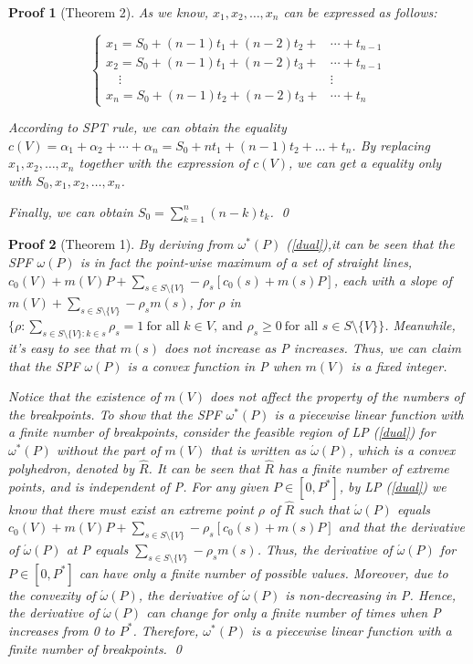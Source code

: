 \documentclass[UTF8]{article}
\newtheorem{pf}{\hspace{2em}Proof}
\begin{document}
\begin{pf}[Theorem 2]
As we know, $x_1,x_2,\dots,x_n$ can be expressed as follows:

\[
\begin{cases}
x_1 = S_0 + (n-1)t_1 + (n-2)t_2 + &\cdots + t_{n-1} \\
x_2 = S_0 + (n-1)t_1 + (n-2)t_3 + &\cdots + t_{n-1} \\
\quad   \vdots        &\vdots\\
x_n = S_0 + (n-1)t_2 + (n-2)t_3 + &\cdots + t_{n}
\end{cases}
\]

According to SPT rule, we can obtain the equality
$c(V)=\alpha_1+\alpha_2+\cdots+\alpha_n=S_0+nt_1+(n-1)t_2+\dots+t_n$.
By replacing $x_1,x_2,\dots,x_n$ together with the expression of $c(V)$, we can get a equality only with $S_0,x_1,x_2,\dots,x_n$.

Finally, we can obtain $S_0 = \sum_{k=1}^n (n-k)t_k$.
\qed
\end{pf}


\begin{pf}[Theorem 1]

By deriving from $\omega^* (P)$ (\ref{dual}),it can be seen that the SPF $\omega(P)$ is in fact the point-wise maximum of a set of straight lines, $c_0(V)+m(V)P+\sum_{s\in S\setminus\{V\}}-\rho_s[c_0(s)+m(s)P]$, each with a slope of $m(V)+\sum_{s\in S\setminus\{V\}} −\rho_s m(s)$, for $\rho$ in $\{\rho :\sum_{s\in S\setminus \{V\}:k\in s} \rho_s=1\  \text{for all }  k\in V,\ \text{and } \rho_s \geq 0\ \text{for all } s\in S\setminus \{V\} \}$.
Meanwhile, it's easy to see that $m(s)$ does not increase as P increases. Thus, we can claim that the SPF $\omega(P)$ is a convex function in P when $m(V)$ is a fixed integer.

Notice that the existence of $m(V)$ does not affect the property of the numbers of the breakpoints.
To show that the SPF $\omega^* (P)$ is a piecewise linear function with a ﬁnite number of breakpoints, consider the feasible region of LP (\ref{dual}) for $\omega^* (P)$ without the part of $m(V)$ that is written as $\acute{\omega} (P)$, which is a convex polyhedron, denoted by $\hat{R}$. It can be seen that $\hat{R}$ has a ﬁnite number of extreme points, and is independent of P. For any given $P \in [0,P^*]$, by LP (\ref{dual}) we know that there must exist an extreme point $\rho$ of $\hat{R}$ such that $\acute{\omega} (P)$ equals
$c_0(V)+m(V)P+\sum_{s\in S\setminus\{V\}}-\rho_s[c_0(s)+m(s)P]$
and that the derivative of $\acute{\omega} (P)$ at P equals $\sum_{s\in S\setminus\{V\}} −\rho_s m(s)$. Thus, the derivative of $\acute{\omega} (P)$ for $P \in [0,P^*]$ can have only a ﬁnite number of possible values. Moreover, due to the convexity of $\acute{\omega} (P)$, the derivative of $\acute{\omega} (P)$ is non-decreasing in P. Hence, the derivative of $\acute{\omega} (P)$ can change for only a ﬁnite number of times when P increases from 0 to $P^*$. Therefore, $\omega^* (P)$ is a piecewise linear function with a ﬁnite number of breakpoints.
\qed
\end{pf}
\end{document}
